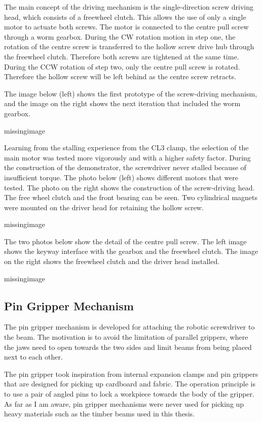 The main concept of the driving mechanism is the single-direction screw driving head, which consists of a freewheel clutch. This allows the use of only a single motor to actuate both screws. The motor is connected to the centre pull screw through a worm gearbox. During the CW rotation motion in step one, the rotation of the centre screw is transferred to the hollow screw drive hub through the freewheel clutch. Therefore both screws are tightened at the same time. During the CCW rotation of step two, only the centre pull screw is rotated. Therefore the hollow screw will be left behind as the centre screw retracts.

The image below (left) shows the first prototype of the screw-driving mechanism, and the image on the right shows the next iteration that included the worm gearbox. 

missingimage

Learning from the stalling experience from the CL3 clamp, the selection of the main motor was tested more vigorously and with a higher safety factor. During the construction of the demonstrator, the screwdriver never stalled because of insufficient torque. The photo below (left) shows different motors that were tested. The photo on the right shows the construction of the screw-driving head. The free wheel clutch and the front bearing can be seen. Two cylindrical magnets were mounted on the driver head for retaining the hollow screw.

missingimage

The two photos below show the detail of the centre pull screw. The left image shows the keyway interface with the gearbox and the freewheel clutch. The image on the right shows the freewheel clutch and the driver head installed.

missingimage

\subsection{Pin Gripper Mechanism}
\label{subsection:exploration-4-pin-gripper-mechanism}

The pin gripper mechanism is developed for attaching the robotic screwdriver to the beam. The motivation is to avoid the limitation of parallel grippers, where the jaws need to open towards the two sides and limit beams from being placed next to each other. 

The pin gripper took inspiration from internal expansion clamps and pin grippers that are designed for picking up cardboard and fabric. The operation principle is to use a pair of angled pins to lock a workpiece towards the body of the gripper. As far as I am aware, pin gripper mechanisms were never used for picking up heavy materials such as the timber beams used in this thesis.

